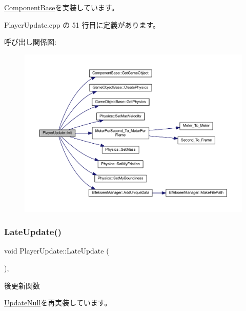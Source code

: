 \mbox{\hyperlink{class_component_base_a125939d6befe42f28886a6523e86b18b}{Component\+Base}}を実装しています。



 Player\+Update.\+cpp の 51 行目に定義があります。

呼び出し関係図\+:\nopagebreak
\begin{figure}[H]
\begin{center}
\leavevmode
\includegraphics[width=350pt]{class_player_update_ac72b39db7b7bfaf094bde9ed1adef4b7_cgraph}
\end{center}
\end{figure}
\mbox{\label{class_player_update_ae376f517f3458edfef61ac366aa78e36}} 
\subsubsection{\texorpdfstring{Late\+Update()}{LateUpdate()}}
{\footnotesize\ttfamily void Player\+Update\+::\+Late\+Update (\begin{DoxyParamCaption}{ }\end{DoxyParamCaption})\hspace{0.3cm}{\ttfamily [override]}, {\ttfamily [virtual]}}



後更新関数 



\mbox{\hyperlink{class_update_null_ac68da1ba7f3fbcae833442bb1c169200}{Update\+Null}}を再実装しています。



